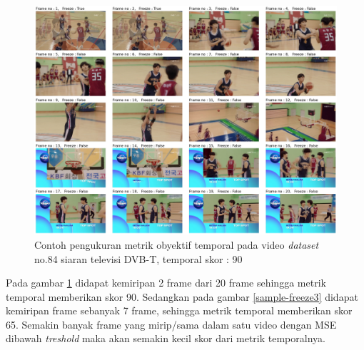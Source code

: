 \begin{figure}[H]
	\vspace{-0.1cm}
	\begin{center}
		\includegraphics[width=1\columnwidth]{bab4/Gambar/sample-freeze4.png}
	\end{center}
	\vspace{-0.2cm}
	\caption{Contoh pengukuran metrik obyektif  temporal pada video \textit{dataset} no.84 siaran televisi DVB-T, temporal skor : 90}
	\label{sample-freeze4}
\end{figure}

Pada gambar \ref{sample-freeze4} didapat kemiripan 2 frame dari 20 frame sehingga metrik temporal memberikan skor 90. Sedangkan pada gambar \ref{sample-freeze3} didapat kemiripan frame sebanyak 7 frame, sehingga metrik temporal memberikan skor 65. Semakin banyak frame yang mirip/sama dalam satu video dengan MSE dibawah \textit{treshold} maka akan semakin kecil skor dari metrik temporalnya.

